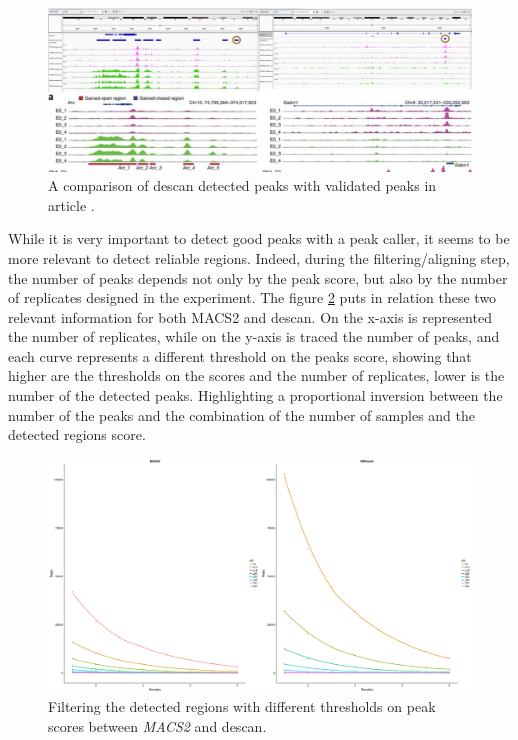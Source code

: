 \begin{figure}[H]
\includegraphics[width=\textwidth,height=\textheight,keepaspectratio]{img/descan2/peaks.png}
\caption[\gls{descan} peaks detection]{A comparison of \gls{descan} detected peaks with validated peaks in article \cite{Su2017}.}
\label{fig:peaksdescan}
\centering
\end{figure}

While it is very important to detect good peaks with a peak caller, it seems to be more relevant to detect reliable regions. Indeed, during the filtering/aligning step, the number of peaks depends not only by the peak score, but also by the number of replicates designed in the experiment.
The figure \ref{fig:filteringdescanmacs2} puts in relation these two relevant information for both MACS2 and \gls{descan}. 
On the x-axis is represented the number of replicates, while on the y-axis is traced the number of peaks, and each curve represents a different threshold on the peaks score, showing that higher are the thresholds on the scores and the number of replicates, lower is the number of the detected peaks.
Highlighting a proportional inversion between the number of the peaks and the combination of the number of samples and the detected regions score.

\begin{figure}[H]
\includegraphics[width=\textwidth, height=\textheight, keepaspectratio]{img/descan2/filtering_m2_d2.png}
\caption[\gls{descan} and \textit{MACS2} filtering comparison]{Filtering the detected regions with different thresholds on peak scores between \textit{MACS2} and \gls{descan}.}
\label{fig:filteringdescanmacs2}
\centering
\end{figure}


